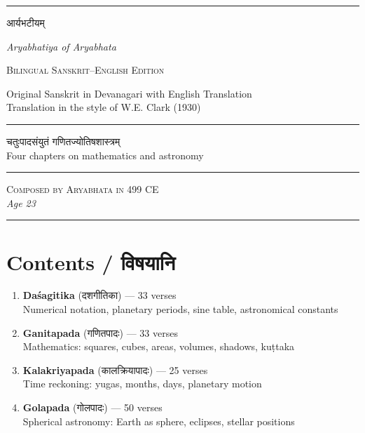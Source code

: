 \documentclass[11pt,a4paper]{article}
\newcommand{\dev}[1]{{\devanagarifont #1}}
\begin{document}
\thispagestyle{empty}
\begin{center}
\vspace*{1.5cm}
{\color{rulecolor}\rule{0.85\textwidth}{1pt}}
\vspace{0.6cm}

{\fontsize{32}{40}\selectfont\devanagarifont\color{titlecolor} आर्यभटीयम्}

\vspace{0.3cm}
{\Large\iastfont\textit{Aryabhatiya of Aryabhata}}

\vspace{0.8cm}
{\large\textsc{Bilingual Sanskrit--English Edition}}

\vspace{0.3cm}
{\normalsize Original Sanskrit in Devanagari with English Translation\\[0.2em]
Translation in the style of W.E. Clark (1930)}

\vspace{0.8cm}
{\color{rulecolor}\rule{0.5\textwidth}{0.5pt}}

\vspace{0.5cm}
{\large\devanagarifont चतुःपादसंयुतं गणितज्योतिषशास्त्रम्\\[0.3em]
Four chapters on mathematics and astronomy}

\vspace{0.5cm}
{\color{rulecolor}\rule{0.5\textwidth}{0.5pt}}

\vspace{0.5cm}
{\small\textsc{Composed by Aryabhata in 499 CE}\\[0.2em]
\textit{Age 23}}

\vspace{0.5cm}
{\color{rulecolor}\rule{0.85\textwidth}{1pt}}
\end{center}
\clearpage

\section*{Contents / \dev{विषयानि}}

\begin{enumerate}[label=\arabic*.,leftmargin=2em]
  \item \textbf{Da\'sagitika} (\dev{दशगीतिका}) --- 33 verses\\ Numerical notation, planetary periods, sine table, astronomical constants
  \item \textbf{Ganitapada} (\dev{गणितपादः}) --- 33 verses\\ Mathematics: squares, cubes, areas, volumes, shadows, ku\d{t}taka
  \item \textbf{Kalakriyapada} (\dev{कालक्रियापादः}) --- 25 verses\\ Time reckoning: yugas, months, days, planetary motion
  \item \textbf{Golapada} (\dev{गोलपादः}) --- 50 verses\\ Spherical astronomy: Earth as sphere, eclipses, stellar positions
\end{enumerate}
\end{document}
